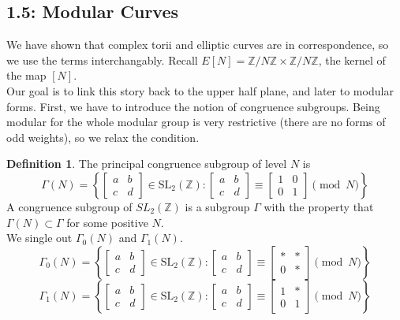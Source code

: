 \documentclass[11pt]{article}
\theoremstyle{plain}
\theoremstyle{definition}
\newtheorem{definition}{Definition}[section]
\theoremstyle{example}
\theoremstyle{remark}
\theoremstyle{lemma}
\theoremstyle{proposition}
\theoremstyle{Problem}
\theoremstyle{Solution}
\theoremstyle{theorem}
\theoremstyle{corollary}
\begin{document}
\subsection{1.5: Modular Curves}
We have shown that complex torii and elliptic curves are in correspondence, so we use the terms interchangably. Recall $E[N] = \mathbb{Z}/N\mathbb{Z} \times \mathbb{Z}/N\mathbb{Z}$, the kernel of the map $[N]$.\\
Our goal is to link this story back to the upper half plane, and later to modular forms. First, we have to introduce the notion of congruence subgroups. Being modular for the whole modular group is very restrictive (there are no forms of odd weights), so we relax the condition.
\begin{definition}
The principal congruence subgroup of level $N$ is 
$$\Gamma(N) = \left\{\begin{bmatrix}
a & b \\
c & d
\end{bmatrix}
\in \mathrm{SL}_2(\mathbb{Z}) \colon
\begin{bmatrix}
a & b \\
c & d
\end{bmatrix}
\equiv
\begin{bmatrix}
1 & 0 \\
0 & 1
\end{bmatrix}
\pmod{N}\right\}$$
A congruence subgroup of $SL_2(\mathbb{Z})$ is a subgroup $\Gamma$ with the property that $\Gamma(N)\subset \Gamma$ for some positive $N$.\\
We single out $\Gamma_0(N)$ and $\Gamma_1(N)$.
$$\Gamma_0(N) = \left\{\begin{bmatrix}
a & b \\
c & d
\end{bmatrix}
\in \mathrm{SL}_2(\mathbb{Z}) \colon
\begin{bmatrix}
a & b \\
c & d
\end{bmatrix}
\equiv
\begin{bmatrix}
* & * \\
0 & *
\end{bmatrix}
\pmod{N}\right\}$$
$$\Gamma_1(N) = \left\{\begin{bmatrix}
a & b \\
c & d
\end{bmatrix}
\in \mathrm{SL}_2(\mathbb{Z}) \colon
\begin{bmatrix}
a & b \\
c & d
\end{bmatrix}
\equiv
\begin{bmatrix}
1 & * \\
0 & 1
\end{bmatrix}
\pmod{N}\right\}$$
\end{definition}
\end{document}
